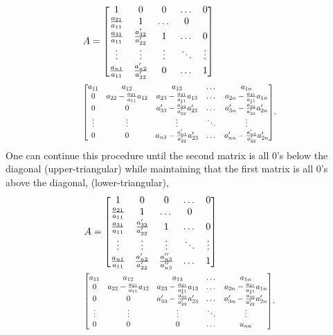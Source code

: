 \documentclass{article}
\begin{document}
\begin{align*}
  &A=\begin{bmatrix} 1  & 0  &  0 &  \dots  & 0 \\
    \frac{a_{21}}{a_{11}} & 1  & \dots  &   0  \\
    \frac{a_{31}}{a_{11}} & \frac{a'_{32}}{a'_{22}}  & 1 & \dots  &   0  \\
    \vdots  & \vdots &  \vdots  &   \ddots  &  \vdots   \\
    \frac{a_{n1}}{a_{11}} & \frac{a'_{n2}}{a'_{22}} &  0   &  \dots  & 1
  \end{bmatrix}  \\
  &  \scalebox{0.8}{\mbox{$\begin{bmatrix}
        a_{11} & a_{12}  &  a_{13} &     \dots &  a_{1n} \\
        0 & a_{22}-\frac{a_{21}}{a_{11}}a_{12}  & a_{23}-\frac{a_{21}}{a_{11}}a_{13} &  \dots &  a_{2n} -\frac{a_{21}}{a_{11}}a_{1n}\\
        0 & 0 &  a'_{33}-\frac{a'_{32}}{a'_{22}}a'_{23} &     \dots &  a'_{3n}-\frac{a'_{32}}{a'_{22}}a'_{2n} \\
        \vdots &  \vdots  & \vdots &  \ddots & \vdots \\
        0 & 0  &  a_{n3} -\frac{a'_{n1}}{a'_{22}}a'_{23}&   \dots &  a'_{nn}-\frac{a'_{n2}}{a'_{22}}a'_{2n}
      \end{bmatrix}$}}.
\end{align*}
% 
One can  continue this  procedure  until  the second matrix  is all  0's  below
the  diagonal (upper-triangular)   while  maintaining  that  the  first matrix
is  all  0's above the  diagonal, (lower-triangular),
% 
\begin{align*}
  &A=\begin{bmatrix} 1  & 0  &  0 &  \dots  & 0 \\
    \frac{a_{21}}{a_{11}} & 1  & \dots  &   0  \\
    \frac{a_{31}}{a_{11}} & \frac{a'_{32}}{a'_{22}}  & 1 & \dots  &   0  \\
    \vdots  & \vdots &  \vdots  &   \ddots  &  \vdots   \\
    \frac{a_{n1}}{a_{11}} & \frac{a'_{n2}}{a'_{22}} &  \frac{a''_{n3}}{a''_{n3}}   &  \dots  & 1
  \end{bmatrix}  \\
  &  \scalebox{0.8}{\mbox{$\begin{bmatrix}
        a_{11} & a_{12}  &  a_{13} &     \dots &  a_{1n} \\
        0 & a_{22}-\frac{a_{21}}{a_{11}}a_{12}  & a_{23}-\frac{a_{21}}{a_{11}}a_{13} &  \dots &  a_{2n} -\frac{a_{21}}{a_{11}}a_{1n}\\
        0 & 0 &  a'_{33}-\frac{a'_{32}}{a'_{22}}a'_{23} &     \dots &  a'_{3n}-\frac{a'_{32}}{a'_{22}}a'_{2n} \\
        \vdots &  \vdots  & \vdots &  \ddots & \vdots \\
        0 & 0  &  0&   \dots &  u_{nn}
      \end{bmatrix}$}}.
\end{align*}
\end{document}
